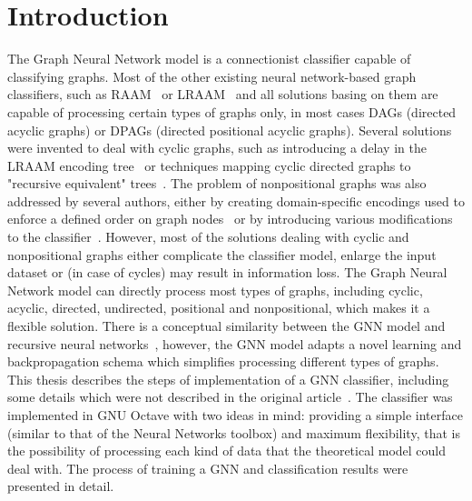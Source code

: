 
\chapter{Introduction}
The Graph Neural Network model is a connectionist classifier capable of classifying graphs. Most of the other existing neural network-based graph classifiers, such as RAAM~\cite{pollack1990recursive} or  LRAAM~\cite{sperduti1994labelling} and all solutions basing on them are capable of processing certain types of graphs only, in most cases DAGs (directed acyclic graphs) or DPAGs (directed positional acyclic graphs).
Several solutions were invented to deal with cyclic graphs, such as introducing a delay in the LRAAM encoding tree~\cite{goulon2005hopfield} or techniques mapping cyclic directed graphs to "recursive equivalent" trees~\cite{bianchini2003backpropagation}.
The problem of nonpositional graphs was also addressed by several authors, either by creating domain-specific encodings used to enforce a defined order on graph nodes~\cite{ivanciuc2003canonical} or by introducing various modifications to the classifier~\cite{bianchini2005recursive}.
However, most of the solutions dealing with cyclic and nonpositional graphs either complicate the classifier model, enlarge the input dataset or (in case of cycles) may result in information loss. The Graph Neural Network model can directly process most types of graphs, including cyclic, acyclic, directed, undirected, positional and nonpositional, which makes it a flexible solution.
There is a conceptual similarity between the GNN model and recursive neural networks~\cite{frasconi1998general}, however, the GNN model adapts a novel learning and backpropagation schema which simplifies processing different types of graphs.
This thesis describes the steps of implementation of a GNN classifier, including some details which were not described in the original article~\cite{scarselli2009graph}. The classifier was implemented in GNU Octave with two ideas in mind: providing a simple interface (similar to that of the Neural Networks toolbox) and maximum flexibility, that is the possibility of processing each kind of data that the theoretical model could deal with. The process of training a GNN and classification results were presented in detail.

